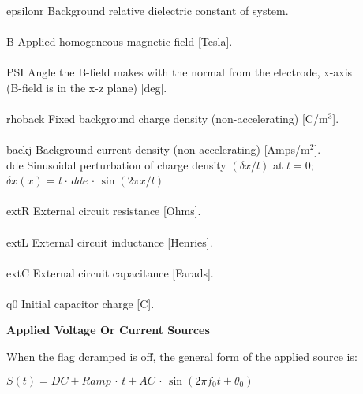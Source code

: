 \begin{section}
\begin{subsection}
\begin{subsubsection}
\begin{tabbing}
						\\
      epsilonr \>   Background relative dielectric constant of system. \> \\
							\\
      B   \>        Applied homogeneous magnetic field [Tesla]. \> \\
							\\
      PSI \>        Angle the B-field makes with the normal from the electrode,
                    x-axis \> \\
	  \>        (B-field is in the x-z plane) [deg]. \> \\
							\\
      rhoback \>    Fixed background charge density (non-accelerating) [C/{\rm m$^{3}$}]. \> \\
							\\
      backj   \>    Background current density (non-accelerating) [Amps/{\rm m$^{2}$}]. \> \\

      dde  \>       Sinusoidal perturbation of charge density
                    {\em$(\delta x / l)$} 
			at 
		   	{\em$t = 0$}; \> \\
	   \>       {\em$\delta x (x) = $l$ \, \cdot \, dde \, \cdot \, \sin(2 \pi x/l) $} \> \\
										\\
      extR \>       External circuit resistance [Ohms]. \> \\
								\\
      extL  \>      External circuit inductance [Henries]. \> \\
								\\
      extC  \>      External circuit capacitance [Farads]. \> \\
									\\
      q0   \>       Initial capacitor charge [C]. \> 
\end{tabbing}

\end{subsubsection}

\begin{subsubsection}
{\bf Applied Voltage Or Current Sources}

      When the flag dcramped is off, the general form of the applied source is:

\begin{center}
{\em$S(t) = DC + Ramp \, \cdot \, t + AC \, \cdot \, \sin(2\pi f_{0}t+ \theta_{0})$} 
\end{center}


\end{subsubsection}
\end{subsection}
\end{section}
